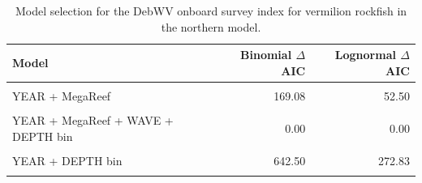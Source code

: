 \documentclass[11pt,
  english,
]{article}
\begin{document}
\FloatBarrier

\begin{table}

\caption{\label{tab:tab-model-select-debwv}Model selection for the DebWV onboard survey index for vermilion rockfish in the northern model.}
\centering
\begin{tabular}[t]{lrr}
\toprule
Model & Binomial $\Delta$AIC & Lognormal $\Delta$AIC\\
\midrule
\cellcolor{gray!6}{1} & \cellcolor{gray!6}{1011.38} & \cellcolor{gray!6}{422.42}\\
YEAR + MegaReef & 169.08 & 52.50\\
\cellcolor{gray!6}{YEAR + MegaReef + WAVE} & \cellcolor{gray!6}{120.32} & \cellcolor{gray!6}{42.13}\\
YEAR + MegaReef + WAVE + DEPTH bin & 0.00 & 0.00\\
\cellcolor{gray!6}{YEAR + WAVE + DEPTH bin} & \cellcolor{gray!6}{611.73} & \cellcolor{gray!6}{260.44}\\
\addlinespace
YEAR + DEPTH bin & 642.50 & 272.83\\
\cellcolor{gray!6}{YEAR + MegaReef + DEPTH bin} & \cellcolor{gray!6}{55.30} & \cellcolor{gray!6}{7.28}\\
\bottomrule
\end{tabular}
\end{table}

\FloatBarrier
\end{document}

